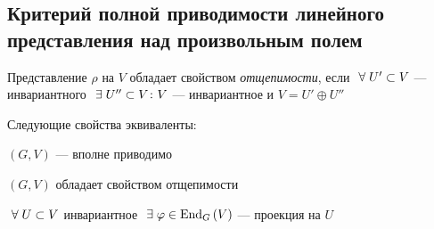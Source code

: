 \subsection{Критерий полной приводимости линейного представления над произвольным полем}
\begin{df}
	Представление $\rho$ на $V$ обладает свойством \textit{отщепимости},
	если $~\forall\; U' \subset V$ --- инвариантного $~\exists\; U'' \subset V \colon V$ --- инвариантное
	и $V = U' \oplus U''$
\end{df}
\begin{stm}
	Следующие свойства эквиваленты:
	\begin{points}{-3}
		\item $(G, V)$ --- вполне приводимо
		\item $(G, V)$ обладает свойством отщепимости
		\item $~\forall\; U \subset V$ инвариантное $~\exists\; \varphi \in \operatorname{End}_G\left(V\right)$ --- проекция на $U$ 
	\end{points}
\end{stm}
